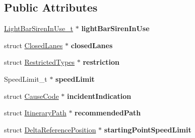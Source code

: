 \subsection*{Public Attributes}
\begin{DoxyCompactItemize}
\item 
\hyperlink{structBIT__STRING__s}{Light\+Bar\+Siren\+In\+Use\+\_\+t} $\ast$ {\bfseries light\+Bar\+Siren\+In\+Use}\hypertarget{structRoadWorksContainerExtended_a05f964bc97fdbdbc19c465765357b328}{}\label{structRoadWorksContainerExtended_a05f964bc97fdbdbc19c465765357b328}

\item 
struct \hyperlink{structClosedLanes}{Closed\+Lanes} $\ast$ {\bfseries closed\+Lanes}\hypertarget{structRoadWorksContainerExtended_a9d8071ee7834206607aa29b2b7648c2d}{}\label{structRoadWorksContainerExtended_a9d8071ee7834206607aa29b2b7648c2d}

\item 
struct \hyperlink{structRestrictedTypes}{Restricted\+Types} $\ast$ {\bfseries restriction}\hypertarget{structRoadWorksContainerExtended_afc7216385acc93d6affc3854ff51acd8}{}\label{structRoadWorksContainerExtended_afc7216385acc93d6affc3854ff51acd8}

\item 
Speed\+Limit\+\_\+t $\ast$ {\bfseries speed\+Limit}\hypertarget{structRoadWorksContainerExtended_af83de2673a337df98495a6464072f34a}{}\label{structRoadWorksContainerExtended_af83de2673a337df98495a6464072f34a}

\item 
struct \hyperlink{structCauseCode}{Cause\+Code} $\ast$ {\bfseries incident\+Indication}\hypertarget{structRoadWorksContainerExtended_a927890fb6156db99fb42f5ea7a1e0c97}{}\label{structRoadWorksContainerExtended_a927890fb6156db99fb42f5ea7a1e0c97}

\item 
struct \hyperlink{structItineraryPath}{Itinerary\+Path} $\ast$ {\bfseries recommended\+Path}\hypertarget{structRoadWorksContainerExtended_a4349e4c641ba89fb394a1a6b9633ab94}{}\label{structRoadWorksContainerExtended_a4349e4c641ba89fb394a1a6b9633ab94}

\item 
struct \hyperlink{structDeltaReferencePosition}{Delta\+Reference\+Position} $\ast$ {\bfseries starting\+Point\+Speed\+Limit}\hypertarget{structRoadWorksContainerExtended_a5b667879a16130f3c28572c142e6578d}{}\label{structRoadWorksContainerExtended_a5b667879a16130f3c28572c142e6578d}


\end{DoxyCompactItemize}
